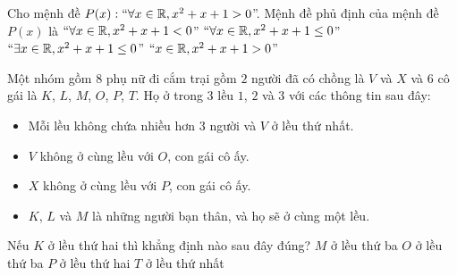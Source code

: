 \begin{ex}%
	Cho mệnh đề $P(x ):``\forall x\in \mathbb{R},x^2+x+1>0$''. Mệnh đề phủ định của mệnh đề $P(x )$ là
	\choice 
	{ $``\forall x\in \mathbb{R},x^2+x+1<0$''}
	{ $``\forall x\in \mathbb{R},x^2+x+1\le 0$''} 
	{ \True $``\exists x\in \mathbb{R},x^2+x+1\le 0$''}
	{ $``x\in \mathbb{R},x^2+x+1>0$''} 
\end{ex}

\begin{ex}
Một nhóm gồm $8$ phụ nữ đi cắm trại gồm $2$ người đã có chồng là $V$ và $X$ và $6$ cô gái là $K$, $L$, $M$, $O$, $P$, $T$. Họ ở trong $3$ lều $1$, $2$ và $3$ với các thông tin sau đây:
\begin{itemize}
\item Mỗi lều không chứa nhiều hơn $3$ người và $V$ ở lều thứ nhất.
\item $V$ không ở cùng lều với $O$, con gái cô ấy.
\item $X$ không ở cùng lều với $P$, con gái cô ấy.
\item $K$, $L$ và $M$ là những người bạn thân, và họ sẽ ở cùng một lều.
\end{itemize}
Nếu $K$ ở lều thứ hai thì khẳng định nào sau đây đúng?
\choice
{$M$ ở lều thứ ba}
{\True $O$ ở lều thứ ba}
{$P$ ở lều thứ hai}
{$T$ ở lều thứ nhất}
\end{ex}

